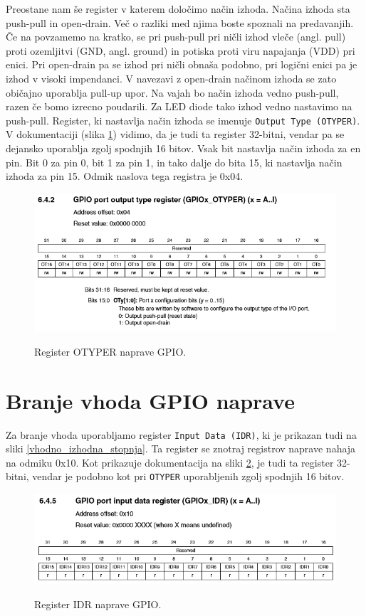 \documentclass[12pt,letterpaper]{article}
\begin{document}
Preostane nam še register v katerem določimo način izhoda. Načina izhoda sta push-pull in open-drain. Več o razliki med njima boste spoznali na predavanjih. Če na povzamemo na kratko, se pri push-pull pri ničli izhod vleče (angl. pull) proti ozemljitvi (GND, angl. ground) in potiska proti viru napajanja (VDD) pri enici. Pri open-drain pa se izhod pri ničli obnaša podobno, pri logični enici pa je izhod v visoki impendanci. V navezavi z open-drain načinom izhoda se zato običajno uporablja pull-up upor. Na vajah bo način izhoda vedno push-pull, razen če bomo izrecno poudarili. Za LED diode tako izhod vedno nastavimo na push-pull. Register, ki nastavlja način izhoda se imenuje \texttt{Output Type (OTYPER)}. V dokumentaciji (slika \ref{otyper}) vidimo, da je tudi ta register 32-bitni, vendar pa se dejansko uporablja zgolj spodnjih 16 bitov. Vsak bit nastavlja način izhoda za en pin. Bit 0 za pin 0, bit 1 za pin 1, in tako dalje do bita 15, ki nastavlja način izhoda za pin 15. Odmik naslova tega registra je 0x04.

\begin{figure}[ht!]
  \centering
  \caption{Register OTYPER naprave GPIO.}
  \includegraphics[width=350pt]{images/vaja3/otyper.png}
  \label{otyper}
\end{figure}


\section*{Branje vhoda GPIO naprave}

Za branje vhoda uporabljamo register \texttt{Input Data (IDR)}, ki je prikazan tudi na sliki \ref{vhodno_izhodna_stopnja}. Ta register se znotraj registrov naprave nahaja na odmiku 0x10. Kot prikazuje dokumentacija na sliki \ref{idr}, je tudi ta register 32-bitni, vendar je podobno kot pri \texttt{OTYPER} uporabljenih zgolj spodnjih 16 bitov.

\begin{figure}[ht!]
  \centering
  \caption{Register IDR naprave GPIO.}
  \includegraphics[width=350pt]{images/vaja3/idr.png}
  \label{idr}
\end{figure}
\end{document}
